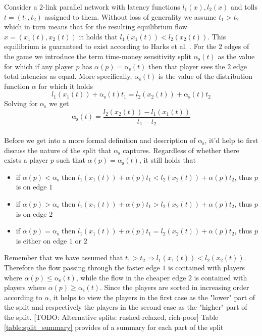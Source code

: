 \documentclass[10pt,a4paper]{book}
\newcommand{\as}{\mathrm{\alpha_s}}
\theoremstyle{definition}
\theoremstyle{comment}
\begin{document}
Consider a 2-link parallel network with latency functions $l_1(x), l_2(x)$ and tolls $t=(t_1, t_2)$ assigned to them.
Without loss of generality we assume $t_1 > t_2$ which in turn means that for the resulting equilibrium flow $x = (x_1(t), x_2(t))$ it holds that $l_1(x_1(t)) < l_2(x_2(t))$.
This equilibrium is guaranteed to exist according to Harks et al. \cite{Harks_2019}.
For the 2 edges of the game we introduce the term time-money sensitivity split $\as(t)$ as the value for which if any player $p$ has $\alpha(p)=\as(t)$ then that player sees the $2$ edge total latencies as equal.
More specifically, $\as(t)$ is the value of the distribution function $\alpha$ for which it holds
\[l_1(x_1(t)) + \as(t) t_1 = l_2(x_2(t)) + \as(t) t_2\]
Solving for $\as$ we get
\[\as(t) = \frac{l_2(x_2(t)) - l_1(x_1(t))}{t_1 - t_2}\]
\\
Before we get into a more formal definition and description of $\as$, it'd help to first discuss the nature of the split that $\as$ captures.
Regardless of whether there exists a player $p$ such that $\alpha(p) = \as(t)$, it still holds that
\begin{itemize}
	\item if $\alpha(p) < \as$ then $l_1(x_1(t)) + \alpha(p) t_1 < l_2(x_2(t)) + \alpha(p) t_2$, thus $p$ is on edge $1$
	\item if $\alpha(p) > \as$ then $l_1(x_1(t)) + \alpha(p) t_1 > l_2(x_2(t)) + \alpha(p) t_2$, thus $p$ is on edge $2$
	\item if $\alpha(p) = \as$ then $l_1(x_1(t)) + \alpha(p) t_1 = l_2(x_2(t)) + \alpha(p) t_2$, thus $p$ is either on edge $1$ or $2$
\end{itemize}
Remember that we have assumed that $t_1 > t_2 \Rightarrow l_1(x_1(t)) < l_2(x_2(t))$.
Therefore the flow passing through the faster edge $1$ is contained with players where $\alpha(p) \le \as(t)$, while the flow in the cheaper edge $2$ is contained with players where $\alpha(p) \ge \as(t)$.
Since the players are sorted in increasing order according to $\alpha$, it helps to view the players in the first case as the "lower" part of the split and respectively the players in the second case as the "higher" part of the split.
[TODO: Alternative splits: rushed-relaxed, rich-poor]
Table \autoref{table:split_summary} provides of a summary for each part of the split
\end{document}
